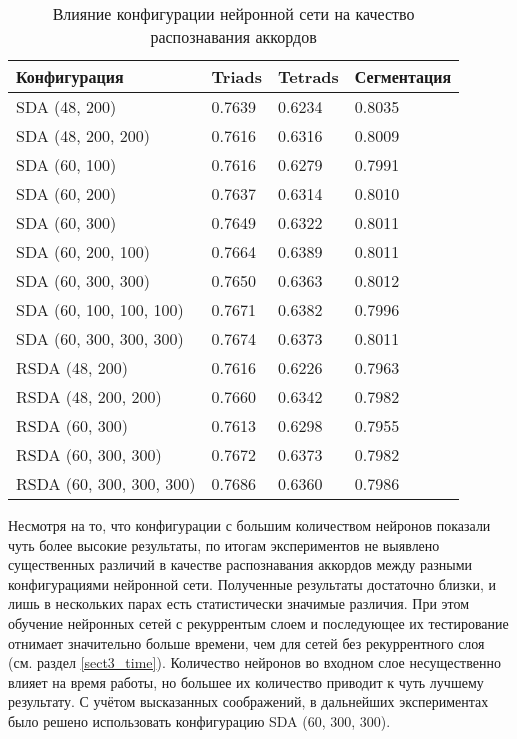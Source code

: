 \begin{table} [htbp]
  \centering
  \parbox{15cm}{\caption{Влияние конфигурации нейронной сети на качество
  распознавания аккордов} \label{Tnnconf}}
  \begin{tabular}{|l|l|l|l|}
  \hline
  Конфигурация & Triads & Tetrads & Сегментация \\
  \hline
  SDA (48, 200) & 0.7639 & 0.6234 & 0.8035 \\
  SDA (48, 200, 200) & 0.7616 & 0.6316 & 0.8009 \\
  SDA (60, 100) & 0.7616 & 0.6279 & 0.7991 \\
  SDA (60, 200) & 0.7637 & 0.6314 & 0.8010 \\
  SDA (60, 300) & 0.7649 & 0.6322 & 0.8011 \\
  SDA (60, 200, 100) & 0.7664 & 0.6389 & 0.8011 \\
  SDA (60, 300, 300) & 0.7650 & 0.6363 & 0.8012 \\
  SDA (60, 100, 100, 100) & 0.7671 & 0.6382 & 0.7996 \\
  SDA (60, 300, 300, 300) & 0.7674 & 0.6373 & 0.8011 \\
  \hline
  RSDA (48, 200) & 0.7616 & 0.6226 & 0.7963 \\
  RSDA (48, 200, 200) & 0.7660 & 0.6342 & 0.7982 \\
  RSDA (60, 300) & 0.7613 & 0.6298 & 0.7955 \\
  RSDA (60, 300, 300) & 0.7672 & 0.6373 & 0.7982 \\
  RSDA (60, 300, 300, 300) & 0.7686 & 0.6360 & 0.7986 \\
  \hline
  \end{tabular}
\end{table}

Несмотря на то, что конфигурации с большим количеством нейронов показали чуть
более высокие результаты, по итогам экспериментов не выявлено существенных
различий в качестве распознавания аккордов между разными конфигурациями
нейронной сети. Полученные результаты достаточно близки, и лишь в нескольких
парах есть статистически значимые различия. При этом обучение нейронных сетей с
рекуррентым слоем и последующее их тестирование отнимает значительно больше
времени, чем для сетей без рекуррентного слоя (см. раздел \ref{sect3_time}).
Количество нейронов во входном слое несущественно влияет на время работы, но
большее их количество приводит к чуть лучшему результату. С учётом высказанных
соображений, в дальнейших экспериментах было решено использовать конфигурацию
SDA (60, 300, 300).

